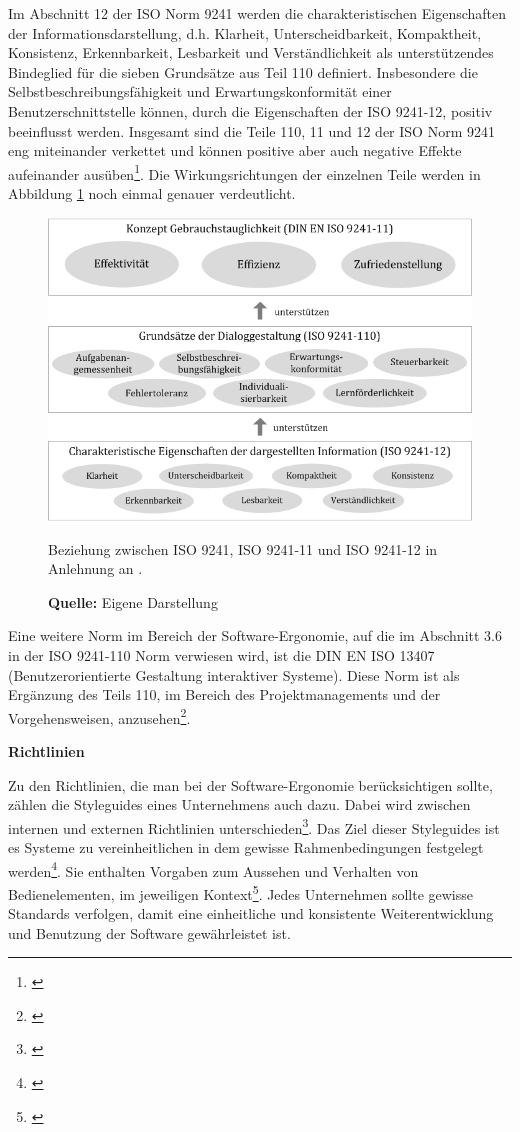 Im Abschnitt 12 der ISO Norm 9241 werden die charakteristischen Eigenschaften der Informationsdarstellung, d.h. Klarheit, Unterscheidbarkeit, Kompaktheit, Konsistenz, Erkennbarkeit, Lesbarkeit und Verständlichkeit als unterstützendes Bindeglied für die sieben Grundsätze aus Teil 110 definiert. Insbesondere die Selbstbeschreibungsfähigkeit und Erwartungskonformität einer Benutzerschnittstelle können, durch die Eigenschaften der ISO 9241-12, positiv beeinflusst werden. Insgesamt sind die Teile 110, 11 und 12 der ISO Norm 9241 eng miteinander verkettet und können positive aber auch negative Effekte aufeinander ausüben\footnote{\cite[vgl.][Kap. 6]{ISO9241-110}}. Die Wirkungsrichtungen der einzelnen Teile werden in Abbildung \ref{fig:beziehungIsoNormen} noch einmal genauer verdeutlicht.
\begin{figure}[H]
  \centering
  \includegraphics[scale=0.80]{img/Beziehung_ISO9241_ISO9241-11_ISO9241-12.png}
  \caption{Beziehung zwischen ISO 9241, ISO 9241-11 und ISO 9241-12 in Anlehnung an \citep[]{ISO9241-110}.}
  \caption*{\textbf{Quelle:} Eigene Darstellung}
  \label{fig:beziehungIsoNormen}
\end{figure}
Eine weitere Norm im Bereich der Software-Ergonomie, auf die im Abschnitt 3.6 in der ISO 9241-110 Norm verwiesen wird, ist die DIN EN ISO 13407 (Benutzerorientierte Gestaltung interaktiver Systeme). Diese Norm ist als Ergänzung des Teils 110, im Bereich des Projektmanagements und der Vorgehensweisen, anzusehen\footnote{\cite[vgl.][58]{Schneider2008}}.

\textbf{Richtlinien}

Zu den Richtlinien, die man bei der Software-Ergonomie berücksichtigen sollte, zählen die Styleguides eines Unternehmens auch dazu. Dabei wird zwischen internen und externen Richtlinien unterschieden\footnote{\cite[vgl.][74]{Richter2013}}. Das Ziel dieser Styleguides ist es Systeme zu vereinheitlichen in dem gewisse Rahmenbedingungen festgelegt werden\footnote{\cite[vgl.][]{Sarodnick2011}}. Sie enthalten Vorgaben zum Aussehen und Verhalten von Bedienelementen, im jeweiligen Kontext\footnote{\cite[vgl.][72]{Richter2013}}. Jedes Unternehmen sollte gewisse Standards verfolgen, damit eine einheitliche und konsistente Weiterentwicklung und Benutzung der Software gewährleistet ist.

